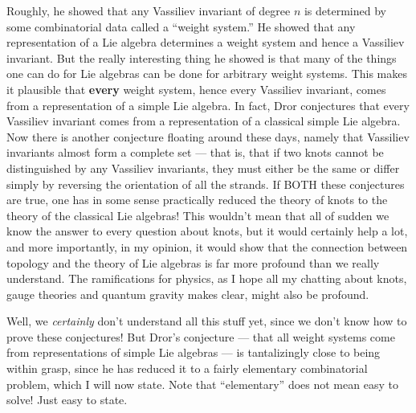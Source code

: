 \documentclass{article}
\begin{document}
Roughly, he showed that any Vassiliev invariant of degree \(n\) is
determined by some combinatorial data called a ``weight system.'' He
showed that any representation of a Lie algebra determines a weight
system and hence a Vassiliev invariant. But the really interesting thing
he showed is that many of the things one can do for Lie algebras can be
done for arbitrary weight systems. This makes it plausible that
\textbf{every} weight system, hence every Vassiliev invariant, comes
from a representation of a simple Lie algebra. In fact, Dror conjectures
that every Vassiliev invariant comes from a representation of a
classical simple Lie algebra. Now there is another conjecture floating
around these days, namely that Vassiliev invariants almost form a
complete set --- that is, that if two knots cannot be distinguished by
any Vassiliev invariants, they must either be the same or differ simply
by reversing the orientation of all the strands. If BOTH these
conjectures are true, one has in some sense practically reduced the
theory of knots to the theory of the classical Lie algebras! This
wouldn't mean that all of sudden we know the answer to every question
about knots, but it would certainly help a lot, and more importantly, in
my opinion, it would show that the connection between topology and the
theory of Lie algebras is far more profound than we really understand.
The ramifications for physics, as I hope all my chatting about knots,
gauge theories and quantum gravity makes clear, might also be profound.

Well, we \emph{certainly} don't understand all this stuff yet, since we
don't know how to prove these conjectures! But Dror's conjecture ---
that all weight systems come from representations of simple Lie algebras
--- is tantalizingly close to being within grasp, since he has reduced
it to a fairly elementary combinatorial problem, which I will now state.
Note that ``elementary'' does not mean easy to solve! Just easy to
state.
\end{document}
